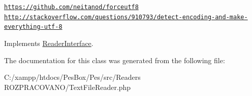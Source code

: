 \href{https://github.com/neitanod/forceutf8}{\tt https\+://github.\+com/neitanod/forceutf8} \href{http://stackoverflow.com/questions/910793/detect-encoding-and-make-everything-utf-8}{\tt http\+://stackoverflow.\+com/questions/910793/detect-\/encoding-\/and-\/make-\/everything-\/utf-\/8} 

Implements \mbox{\hyperlink{interface_pes_1_1_readers_1_1_reader_interface}{Reader\+Interface}}.



The documentation for this class was generated from the following file\+:\begin{DoxyCompactItemize}
\item 
C\+:/xampp/htdocs/\+Pes\+Box/\+Pes/src/\+Readers R\+O\+Z\+P\+R\+A\+C\+O\+V\+A\+N\+O/Text\+File\+Reader.\+php\end{DoxyCompactItemize}
